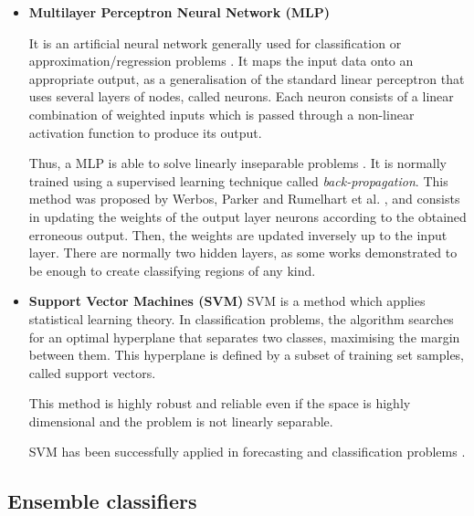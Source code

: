 \documentclass[a4paper,10pt,onecolumn,preprint,3p]{elsarticle}
\begin{document}
\begin{itemize}
\item \textbf{Multilayer Perceptron Neural Network (MLP)}

It is an artificial neural network generally used for classification or 
approximation/regression problems \cite{Rosenblatt1962,Widrow1990}. It maps the input data onto an appropriate output, as a generalisation of the standard linear perceptron that uses several layers of nodes, called neurons. Each neuron consists of a linear combination of weighted inputs which is passed through a non-linear activation function to produce its output.

Thus, a MLP is able to solve linearly inseparable problems \cite{SteinwenderBitzer2003}. It is normally trained using a supervised learning 
technique called \textit{back-propagation}. This method was proposed by Werbos, Parker and Rumelhart et al. \cite{Werbos1974,Parker1985,Rumelhart1985}, and consists in updating the weights of the output layer neurons according to the obtained erroneous output. Then, the weights are updated inversely up to the input layer.
There are normally two hidden layers, as some works \cite{Lippmann1987,Bishop1996} demonstrated to be enough to 
create classifying regions of any kind.


\item \textbf{Support Vector Machines (SVM)}
SVM \cite{Cortes1995,Shevade2000} is a method which applies statistical learning theory. In classification problems, the algorithm searches for an optimal hyperplane that separates two classes, maximising the margin between them. 
This hyperplane is defined by a subset of training set samples, called support vectors.

This method is highly robust and reliable even if the space is highly dimensional and the problem is not linearly separable.

SVM has been successfully applied in forecasting and classification problems \cite{Cao2003,MinSVM05,Jari2008}.


\end{itemize}



\subsection{Ensemble classifiers}
\label{subsec:ensembles}

\end{document}
